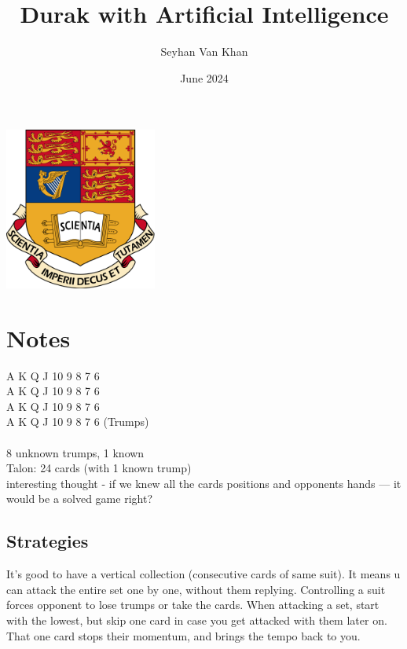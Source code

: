 \documentclass[a4paper, twoside, 12pt]{report}
\title{Durak with Artificial Intelligence}
\author{Seyhan Van Khan}
\date{June 2024}
\begin{document}


\begin{titlepage}
	\centering
	{\huge \@title}
	\includegraphics[width=5cm]{./imperial.png}
	\vfill

\end{titlepage}

\section{Notes}

A K Q J 10 9 8 7 6 \\
A K Q J 10 9 8 7 6 \\
A K Q J 10 9 8 7 6 \\
A K Q J 10 9 8 7 6 (Trumps) \\
\\
8 unknown trumps, 1 known \\

Talon: 24 cards (with 1 known trump) \\

interesting thought - if we knew all the cards positions and opponents hands --- it would be a solved game right?

\subsection*{Strategies}
It's good to have a vertical collection (consecutive cards of same suit). It means u can attack the entire set one by one, without them replying. Controlling a suit forces opponent to lose trumps or take the cards. When attacking a set, start with the lowest, but skip one card in case you get attacked with them later on. That one card stops their momentum, and brings the tempo back to you.
\end{document}
